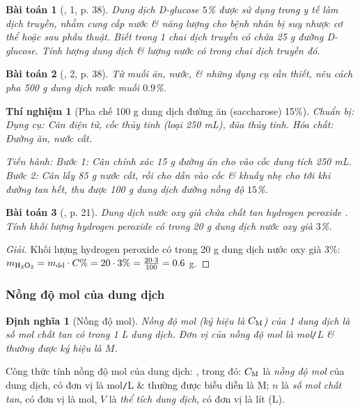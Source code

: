 \documentclass{article}
\newtheorem{baitoan}{Bài toán}
\newtheorem{dinhnghia}{Định nghĩa}
\newtheorem{thinghiem}{Thí nghiệm}
\begin{document}
\begin{baitoan}[\cite{SGK_KHTN_8_Canh_Dieu}, 1, p. 38]
	Dung dịch D-glucose $5$\% được sử dụng trong y tế làm dịch truyền, nhằm cung cấp nước \& năng lượng cho bệnh nhân bị suy nhược cơ thể hoặc sau phẫu thuật. Biết trong 1 chai dịch truyền có chứa \emph{25 g} đường D-glucose. Tính lượng dung dịch \& lượng nước có trong chai dịch truyền đó.
\end{baitoan}

\begin{baitoan}[\cite{SGK_KHTN_8_Canh_Dieu}, 2, p. 38]
	Từ muối ăn, nước, \& những dụng cụ cần thiết, nêu cách pha \emph{500 g} dung dịch nước muối $0.9$\%.
\end{baitoan}

\begin{thinghiem}[Pha chế 100 g dung dịch đường ăn (saccharose)  15\%]
	 \emph{Chuẩn bị:} Dụng cụ: Cân điện tử, cốc thủy tinh (loại \emph{250 mL}), đũa thủy tinh. Hóa chất: Đường ăn, nước cất.
	 
	 \emph{Tiến hành:} Bước 1: Cân chính xác \emph{15 g} đường ăn cho vào cốc dung tích \emph{250 mL}. Bước 2: Cân lấy \emph{85 g} nước cất, rồi cho dần vào cốc \& khuấy nhẹ cho tới khi đường tan hết, thu được \emph{100 g} dung dịch đường nồng độ $15$\%.
\end{thinghiem}

\begin{baitoan}[\cite{SGK_KHTN_8_KNTTVCS}, p. 21]
	Dung dịch nước oxy già chứa chất tan hydrogen peroxide \emph{}. Tính khối lượng hydrogen peroxide có trong \emph{20 g} dung dịch nước oxy già $3$\%.
\end{baitoan}

\begin{proof}[Giải]
	Khối lượng hydrogen peroxide có trong 20 g dung dịch nước oxy già 3\%: $m_{\ce{H2O2}} = m_{\rm dd}\cdot C\% = 20\cdot3\% = \frac{20\cdot3}{100} = 0.6$ g.
\end{proof}

\subsubsection{Nồng độ mol của dung dịch}

\begin{dinhnghia}[Nồng độ mol]
	\emph{Nồng độ mol} (ký hiệu là $C_{\rm M}$) của 1 dung dịch là số mol chất tan có trong \emph{1 L} dung dịch. Đơn vị của nồng độ mol là \emph{mol\texttt{/}L} \& thường được ký hiệu là $M$.
\end{dinhnghia}
Công thức tính nồng độ mol của dung dịch: , trong đó: $C_{\rm M}$ là \textit{nồng độ mol} của dung dịch, có đơn vị là mol\texttt{/}L \& thường được biễu diễn là M; $n$ là \textit{số mol chất tan}, có đơn vị là mol, $V$ là \textit{thể tích dung dịch}, có đơn vị là lít (L).
\end{document}

